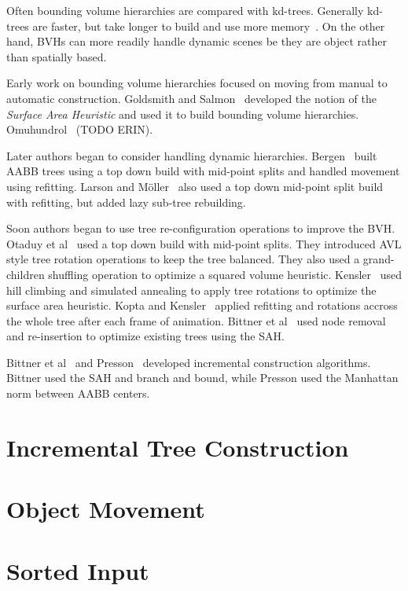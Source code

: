 \documentclass{article}
\begin{document}
Often bounding volume hierarchies are compared with kd-trees. Generally kd-trees are faster, but take longer to build and use more memory~\cite{Vinkler2014}. On the other hand, BVHs can more readily handle dynamic scenes be they are object rather than spatially based.

Early work on bounding volume hierarchies focused on moving from manual to automatic construction. Goldsmith and Salmon~\cite{Goldsmith1987} developed the notion of the \emph{Surface Area Heuristic} and used it to build bounding volume hierarchies. Omuhundrol~\cite{Omohundrol1989} (TODO ERIN).

Later authors began to consider handling dynamic hierarchies. Bergen~\cite{Bergen1998} built AABB trees using a top down build with mid-point splits and handled movement using refitting. Larson and Möller~\cite{Larsson2006} also used a top down mid-point split build with refitting, but added lazy sub-tree rebuilding.

Soon authors began to use tree re-configuration operations to improve the BVH. Otaduy et al~\cite{Otaduy2007} used a top down build with mid-point splits. They introduced AVL style tree rotation operations to keep the tree balanced. They also used a grand-children shuffling operation to optimize a squared volume heuristic. Kensler~\cite{Kensler2008} used hill climbing and simulated annealing to apply tree rotations to optimize the surface area heuristic. Kopta and Kensler~\cite{Kopta2012} applied refitting and rotations accross the whole tree after each frame of animation. Bittner et al~\cite{Bittner2013} used node removal and re-insertion to optimize existing trees using the SAH.

Bittner et al~\cite{Bittner2015} and Presson~\cite{Presson2008} developed incremental construction algorithms. Bittner used the SAH and branch and bound, while Presson used the Manhattan norm between AABB centers.

\section{Incremental Tree Construction}

\section{Object Movement}

\section{Sorted Input}
\end{document}
